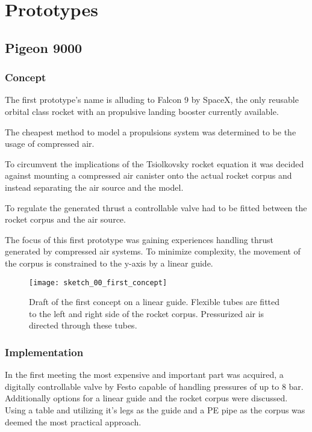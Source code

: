 \chapter{Prototypes}

\section{Pigeon 9000}

\subsection{Concept}
The first prototype's name is alluding to Falcon 9 by SpaceX, the only reusable orbital class rocket with an propulsive landing booster currently available. 

The cheapest method to model a propulsions system was determined to be the usage of compressed air. 

To circumvent the implications of the Tsiolkovsky rocket equation it was decided against mounting a compressed air canister onto the actual rocket corpus and instead separating the air source and the model.

To regulate the generated thrust a controllable valve had to be fitted between the rocket corpus and the air source. 

The focus of this first prototype was gaining experiences handling thrust generated by compressed air systems. To minimize complexity, the movement of the corpus is constrained to the y-axis by a linear guide.

\begin{figure}[hp]
\centering

\texttt{[image: sketch\_00\_first\_concept]}

\caption{Draft of the first concept on a linear guide. Flexible tubes are fitted to the left and right side of the rocket corpus. Pressurized air is directed through these tubes.}
\end{figure}

   
\subsection{Implementation}
In the first meeting the most expensive and important part was acquired, a digitally controllable valve by Festo capable of handling pressures of up to 8 bar. Additionally options for a linear guide and the rocket corpus were discussed. Using a table and utilizing it's legs as the guide and a PE pipe as the corpus was deemed the most practical approach. 

